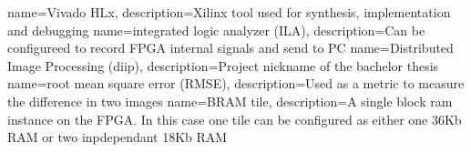 %
%
{
    name=Vivado HLx,
    description={Xilinx tool used for synthesis, implementation and debugging}
}
{
    name=integrated logic analyzer (ILA),
    description={Can be configureed to record FPGA internal signals and send to PC}
}
{
    name=Distributed Image Processing (diip),
    description={Project nickname of the bachelor thesis}
}
{
    name=root mean square error (RMSE),
    description={Used as a metric to measure the difference in two images}
}
{
    name=BRAM tile,
    description={A single block ram instance on the FPGA. In this case one tile
    can be configured as either one 36Kb RAM or two inpdependant 18Kb RAM}
}